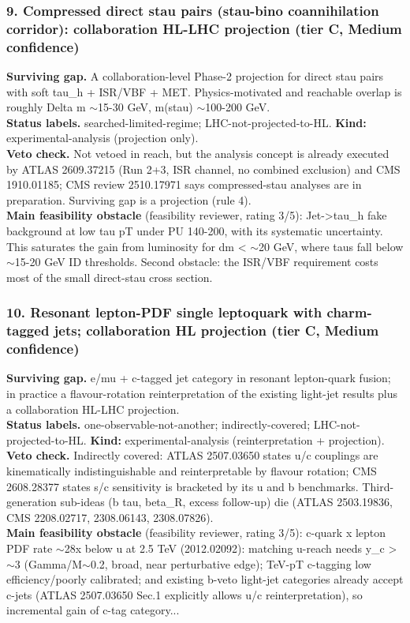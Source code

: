 \documentclass[11pt,a4paper]{article}
\begin{document}
\subsubsection*{9. Compressed direct stau pairs (stau-bino coannihilation corridor): collaboration HL-LHC projection (tier C, Medium confidence)}
\textbf{Surviving gap.} A collaboration-level Phase-2 projection for direct stau pairs with soft tau\_h + ISR/VBF + MET. Physics-motivated and reachable overlap is roughly Delta m $\sim$15-30 GeV, m(stau) $\sim$100-200 GeV.\\
\textbf{Status labels.} searched-limited-regime; LHC-not-projected-to-HL. \textbf{Kind:} experimental-analysis (projection only).\\
\textbf{Veto check.} Not vetoed in reach, but the analysis concept is already executed by ATLAS 2609.37215 (Run 2+3, ISR channel, no combined exclusion) and CMS 1910.01185; CMS review 2510.17971 says compressed-stau analyses are in preparation. Surviving gap is a projection (rule 4).
\\\textbf{Main feasibility obstacle} (feasibility reviewer, rating 3/5): Jet->tau\_h fake background at low tau pT under PU 140-200, with its systematic uncertainty. This saturates the gain from luminosity for dm < $\sim$20 GeV, where taus fall below $\sim$15-20 GeV ID thresholds. Second obstacle: the ISR/VBF requirement costs most of the small direct-stau cross section.

\subsubsection*{10. Resonant lepton-PDF single leptoquark with charm-tagged jets; collaboration HL projection (tier C, Medium confidence)}
\textbf{Surviving gap.} e/mu + c-tagged jet category in resonant lepton-quark fusion; in practice a flavour-rotation reinterpretation of the existing light-jet results plus a collaboration HL-LHC projection.\\
\textbf{Status labels.} one-observable-not-another; indirectly-covered; LHC-not-projected-to-HL. \textbf{Kind:} experimental-analysis (reinterpretation + projection).\\
\textbf{Veto check.} Indirectly covered: ATLAS 2507.03650 states u/c couplings are kinematically indistinguishable and reinterpretable by flavour rotation; CMS 2608.28377 states s/c sensitivity is bracketed by its u and b benchmarks. Third-generation sub-ideas (b tau, beta\_R, excess follow-up) die (ATLAS 2503.19836, CMS 2208.02717, 2308.06143, 2308.07826).
\\\textbf{Main feasibility obstacle} (feasibility reviewer, rating 3/5): c-quark x lepton PDF rate $\sim$28x below u at 2.5 TeV (2012.02092): matching u-reach needs y\_c >$\sim$3 (Gamma/M$\sim$0.2, broad, near perturbative edge); TeV-pT c-tagging low efficiency/poorly calibrated; and existing b-veto light-jet categories already accept c-jets (ATLAS 2507.03650 Sec.1 explicitly allows u/c reinterpretation), so incremental gain of c-tag category...
\end{document}
